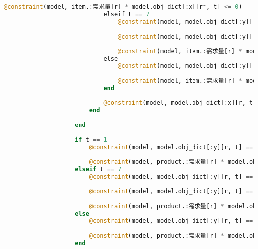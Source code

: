\begin{appendices}
\begin{lstlisting}[language=julia]
                                @constraint(model, item.:需求量[r] * model.obj_dict[:x][r⁻, t] <= 0)
                            elseif t == 7
                                @constraint(model, model.obj_dict[:y][r, t] == model.obj_dict[:y][r, t-1] + model.obj_dict[:x][r, t] - item.:需求量[r] * model.obj_dict[:x][r⁻, t])
    
                                @constraint(model, model.obj_dict[:y][r, t] == 0)
    
                                @constraint(model, item.:需求量[r] * model.obj_dict[:x][r⁻, t] <= model.obj_dict[:y][r, t-1])
                            else
                                @constraint(model, model.obj_dict[:y][r, t] == model.obj_dict[:y][r, t-1] + model.obj_dict[:x][r, t] - item.:需求量[r] * model.obj_dict[:x][r⁻, t])
    
                                @constraint(model, item.:需求量[r] * model.obj_dict[:x][r⁻, t] <= model.obj_dict[:y][r, t-1])
                            end
    
                            @constraint(model, model.obj_dict[:x][r, t] == model.obj_dict[:x][r, t] * model.obj_dict[:ω][r, t])
                        end
    
                    end
    
                    if t == 1
                        @constraint(model, model.obj_dict[:y][r, t] == 0 + model.obj_dict[:x][r, t] - product.:需求量[r] * model.obj_dict[:x][r⁻, t])
    
                        @constraint(model, product.:需求量[r] * model.obj_dict[:x][r⁻, t] <= 0)
                    elseif t == 7
                        @constraint(model, model.obj_dict[:y][r, t] == model.obj_dict[:y][r, t-1] + model.obj_dict[:x][r, t] - product.:需求量[r] * model.obj_dict[:x][r⁻, t])
    
                        @constraint(model, model.obj_dict[:y][r, t] == 0)
    
                        @constraint(model, product.:需求量[r] * model.obj_dict[:x][r⁻, t] <= model.obj_dict[:y][r, t-1])
                    else
                        @constraint(model, model.obj_dict[:y][r, t] == model.obj_dict[:y][r, t-1] + model.obj_dict[:x][r, t] - product.:需求量[r] * model.obj_dict[:x][r⁻, t])
    
                        @constraint(model, product.:需求量[r] * model.obj_dict[:x][r⁻, t] <= model.obj_dict[:y][r, t-1])
                    end
    

\end{lstlisting}
\end{appendices}
